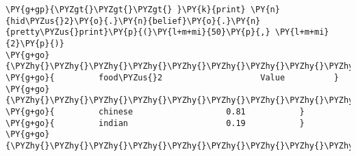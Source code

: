 \begin{example}
\begin{Verbatim}[commandchars=\\\{\}]
\PY{g+gp}{\PYZgt{}\PYZgt{}\PYZgt{} }\PY{k}{print} \PY{n}{hid\PYZus{}2}\PY{o}{.}\PY{n}{belief}\PY{o}{.}\PY{n}{pretty\PYZus{}print}\PY{p}{(}\PY{l+m+mi}{50}\PY{p}{,} \PY{l+m+mi}{2}\PY{p}{)}
\PY{g+go}{\PYZhy{}\PYZhy{}\PYZhy{}\PYZhy{}\PYZhy{}\PYZhy{}\PYZhy{}\PYZhy{}\PYZhy{}\PYZhy{}\PYZhy{}\PYZhy{}\PYZhy{}\PYZhy{}\PYZhy{}\PYZhy{}\PYZhy{}\PYZhy{}\PYZhy{}\PYZhy{}\PYZhy{}\PYZhy{}\PYZhy{}\PYZhy{}\PYZhy{}\PYZhy{}\PYZhy{}\PYZhy{}\PYZhy{}\PYZhy{}\PYZhy{}\PYZhy{}\PYZhy{}\PYZhy{}\PYZhy{}\PYZhy{}\PYZhy{}\PYZhy{}\PYZhy{}\PYZhy{}\PYZhy{}\PYZhy{}\PYZhy{}\PYZhy{}\PYZhy{}\PYZhy{}\PYZhy{}\PYZhy{}\PYZhy{}\PYZhy{}}
\PY{g+go}{         food\PYZus{}2                    Value          }
\PY{g+go}{\PYZhy{}\PYZhy{}\PYZhy{}\PYZhy{}\PYZhy{}\PYZhy{}\PYZhy{}\PYZhy{}\PYZhy{}\PYZhy{}\PYZhy{}\PYZhy{}\PYZhy{}\PYZhy{}\PYZhy{}\PYZhy{}\PYZhy{}\PYZhy{}\PYZhy{}\PYZhy{}\PYZhy{}\PYZhy{}\PYZhy{}\PYZhy{}\PYZhy{}\PYZhy{}\PYZhy{}\PYZhy{}\PYZhy{}\PYZhy{}\PYZhy{}\PYZhy{}\PYZhy{}\PYZhy{}\PYZhy{}\PYZhy{}\PYZhy{}\PYZhy{}\PYZhy{}\PYZhy{}\PYZhy{}\PYZhy{}\PYZhy{}\PYZhy{}\PYZhy{}\PYZhy{}\PYZhy{}\PYZhy{}\PYZhy{}\PYZhy{}}
\PY{g+go}{         chinese                   0.81           }
\PY{g+go}{         indian                    0.19           }
\PY{g+go}{\PYZhy{}\PYZhy{}\PYZhy{}\PYZhy{}\PYZhy{}\PYZhy{}\PYZhy{}\PYZhy{}\PYZhy{}\PYZhy{}\PYZhy{}\PYZhy{}\PYZhy{}\PYZhy{}\PYZhy{}\PYZhy{}\PYZhy{}\PYZhy{}\PYZhy{}\PYZhy{}\PYZhy{}\PYZhy{}\PYZhy{}\PYZhy{}\PYZhy{}\PYZhy{}\PYZhy{}\PYZhy{}\PYZhy{}\PYZhy{}\PYZhy{}\PYZhy{}\PYZhy{}\PYZhy{}\PYZhy{}\PYZhy{}\PYZhy{}\PYZhy{}\PYZhy{}\PYZhy{}\PYZhy{}\PYZhy{}\PYZhy{}\PYZhy{}\PYZhy{}\PYZhy{}\PYZhy{}\PYZhy{}\PYZhy{}\PYZhy{}}


\end{Verbatim}
\end{example}
